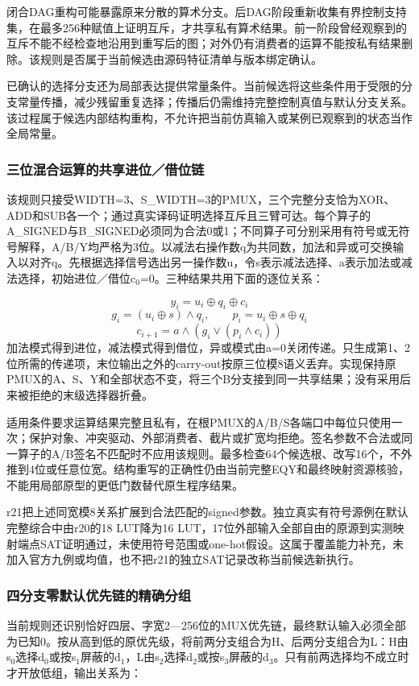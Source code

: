 \documentclass[UTF8,fontset=fandol,12pt]{ctexart}
\begin{document}
闭合DAG重构可能暴露原来分散的算术分支。后DAG阶段重新收集有界控制支持集，在最多256种赋值上证明互斥，才共享私有算术结果。前一阶段曾经观察到的互斥不能不经检查地沿用到重写后的图；对外仍有消费者的运算不能按私有结果删除。该规则是否属于当前候选由源码特征清单与版本绑定确认。

已确认的选择分支还为局部表达提供常量条件。当前候选将这些条件用于受限的分支常量传播，减少残留重复选择；传播后仍需维持完整控制真值与默认分支关系。该过程属于候选内部结构重构，不允许把当前仿真输入或某例已观察到的状态当作全局常量。

\Needspace{237.6pt}\subsubsection*{三位混合运算的共享进位／借位链}
该规则只接受WIDTH=3、S\_\allowbreak{}WIDTH=3的PMUX，三个完整分支恰为XOR、ADD和SUB各一个；通过真实译码证明选择互斥且三臂可达。每个算子的A\_\allowbreak{}SIGNED与B\_\allowbreak{}SIGNED必须同为合法0或1；不同算子可分别采用有符号或无符号解释，A/\allowbreak{}B/\allowbreak{}Y均严格为3位。以减法右操作数q为共同数，加法和异或可交换输入以对齐q。先根据选择信号选出另一操作数u，令s表示减法选择、a表示加法或减法选择，初始进位／借位c\ensuremath{{}_0}=0。三种结果共用下面的逐位关系：

\[
y_i=u_i\oplus q_i\oplus c_i
\]
\[
g_i=(u_i\oplus s)\land q_i,\qquad p_i=u_i\oplus s\oplus q_i
\]
\[
c_{i+1}=a\land(g_i\lor(p_i\land c_i))
\]
加法模式得到进位，减法模式得到借位，异或模式由a=0关闭传递。只生成第1、2位所需的传递项，末位输出之外的carry-out按原三位模8语义丢弃。实现保持原PMUX的A、S、Y和全部状态不变，将三个B分支接到同一共享结果；没有采用后来被拒绝的末级选择器折叠。

适用条件要求运算结果完整且私有，在根PMUX的A/\allowbreak{}B/\allowbreak{}S各端口中每位只使用一次；保护对象、冲突驱动、外部消费者、截片或扩宽均拒绝。签名参数不合法或同一算子的A/\allowbreak{}B签名不匹配时不应用该规则。最多检查64个候选根、改写16个，不外推到4位或任意位宽。结构重写的正确性仍由当前完整EQY和最终映射资源核验，不能用局部原型的更低门数替代原生程序结果。

r21把上述同宽模8关系扩展到合法匹配的signed参数。独立真实有符号源例在默认完整综合中由r20的18 LUT降为16 LUT，17位外部输入全部自由的原源到实测映射端点SAT证明通过，未使用符号范围或one-hot假设。这属于覆盖能力补充，未加入官方九例或均值，也不把r21的独立SAT记录改称当前候选新执行。

\Needspace{237.6pt}\subsubsection*{四分支零默认优先链的精确分组}
当前规则还识别恰好四层、字宽2—256位的MUX优先链，最终默认输入必须全部为已知0。按从高到低的原优先级，将前两分支组合为H、后两分支组合为L：H由s\ensuremath{{}_0}选择d\ensuremath{{}_0}或按s\ensuremath{{}_1}屏蔽的d\ensuremath{{}_1}，L由s\ensuremath{{}_2}选择d\ensuremath{{}_2}或按s\ensuremath{{}_3}屏蔽的d\ensuremath{{}_3}。只有前两选择均不成立时才开放低组，输出关系为：
\end{document}
